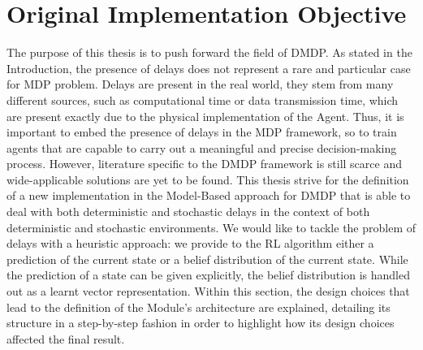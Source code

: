     \section{Original Implementation Objective}
    \label{ow:purposethesis}
        The purpose of this thesis is to push forward the field of DMDP. As stated in the Introduction, the presence of delays does not represent a rare and particular case for MDP problem. Delays are present in the real world, they stem from many different sources, such as computational time or data transmission time, which are present exactly due to the physical implementation of the Agent. Thus, it is important to embed the presence of delays in the MDP framework, so to train agents that are capable to carry out a meaningful and precise decision-making process. However, literature specific to the DMDP framework is still scarce and wide-applicable solutions are yet to be found. \newline
        This thesis strive for the definition of a new implementation in the Model-Based approach for DMDP that is able to deal with both deterministic and stochastic delays in the context of both deterministic and stochastic environments. We would like to tackle the problem of delays with a heuristic approach: we provide to the RL algorithm either a prediction of the current state or a belief distribution of the current state. While the prediction of a state can be given explicitly, the belief distribution is handled out as a learnt vector representation. \newline
        Within this section, the design choices that lead to the definition of the Module's architecture are explained, detailing its structure in a step-by-step fashion in order to highlight how its design choices affected the final result. 
        
